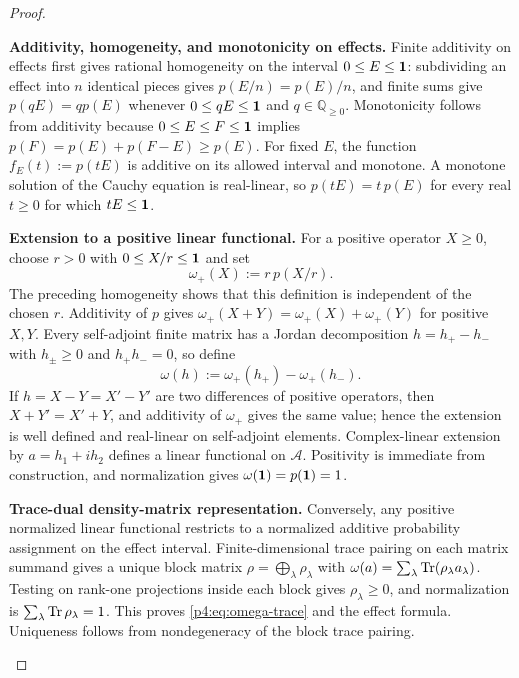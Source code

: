 \documentclass[12pt,a4paper]{article}
\begin{document}
\begin{proof}
\begin{proofsteps}

\item \textbf{Additivity, homogeneity, and monotonicity on effects.}
Finite additivity on effects first gives rational homogeneity on the interval
\(0\le E\le\mathbf{1}\): subdividing an effect into \(n\) identical pieces gives
\(p(E/n)=p(E)/n\), and finite sums give \(p(qE)=q p(E)\) whenever
\(0\le qE\le\mathbf{1}\) and \(q\in\mathbb Q_{\ge0}\).  Monotonicity follows from
additivity because \(0\le E\le F\le\mathbf{1}\) implies
\(p(F)=p(E)+p(F-E)\ge p(E)\).  For fixed \(E\), the function
\(f_E(t):=p(tE)\) is additive on its allowed interval and monotone.  A monotone
solution of the Cauchy equation is real-linear, so
\(p(tE)=t\,p(E)\) for every real \(t\ge0\) for which \(tE\le\mathbf{1}\).


\item \textbf{Extension to a positive linear functional.}
For a positive operator \(X\ge0\), choose \(r>0\) with \(0\le X/r\le\mathbf{1}\) and set
\[
\omega_+(X):=r\,p(X/r).
\]
The preceding homogeneity shows that this definition is independent of the chosen
\(r\).  Additivity of \(p\) gives
\(\omega_+(X+Y)=\omega_+(X)+\omega_+(Y)\) for positive \(X,Y\).  Every self-adjoint
finite matrix has a Jordan decomposition \(h=h_+-h_-\) with \(h_\pm\ge0\) and
\(h_+h_-=0\), so define
\[
\omega(h):=\omega_+(h_+)-\omega_+(h_-).
\]
If \(h=X-Y=X'-Y'\) are two differences of positive operators, then
\(X+Y'=X'+Y\), and additivity of \(\omega_+\) gives the same value; hence the
extension is well defined and real-linear on self-adjoint elements.  Complex-linear
extension by \(a=h_1+ih_2\) defines a linear functional on
\(\mathcal A\).  Positivity is immediate from construction, and
normalization gives \(\omega(\mathbf{1})=p(\mathbf{1})=1\).


\item \textbf{Trace-dual density-matrix representation.}
Conversely, any positive normalized linear functional restricts to a normalized
additive probability assignment on the effect interval.  Finite-dimensional
trace pairing on each matrix summand gives a unique block matrix
\(\rho=\bigoplus_\lambda\rho_\lambda\) with
\(\omega(a)=\sum_\lambda\operatorname{Tr}(\rho_\lambda a_\lambda)\).  Testing on rank-one
projections inside each block gives \(\rho_\lambda\ge0\), and normalization is
\(\sum_\lambda\operatorname{Tr}\rho_\lambda=1\).  This proves
\eqref{p4:eq:omega-trace} and the effect formula.  Uniqueness follows from
nondegeneracy of the block trace pairing.



\end{proofsteps}
\end{proof}
\end{document}
